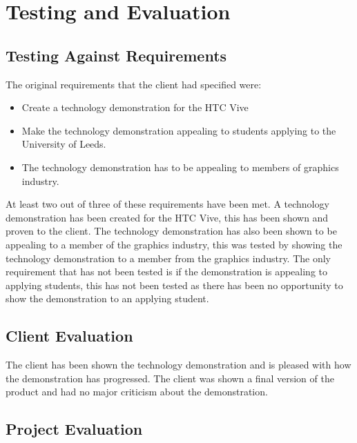 \chapter{Testing and Evaluation}
\label{chapter7}

\section{Testing Against Requirements}
	The original requirements that the client had specified were:

\begin{itemize}
	\item Create a technology demonstration for the HTC Vive
	\item Make the technology demonstration appealing to students applying to the University of Leeds.
	\item The technology demonstration has to be appealing to members of graphics industry.
\end{itemize}

	At least two out of three of these requirements have been met. A technology demonstration has been created for the HTC Vive, this has been shown and proven to the client. The technology demonstration has also been shown to be appealing to a member of the graphics industry, this was tested by showing the technology demonstration to a member from the graphics industry. The only requirement that has not been tested is if the demonstration is appealing to applying students, this has not been tested as there has been no opportunity to show the demonstration to an applying student.

\section{Client Evaluation}
	The client has been shown the technology demonstration and is pleased with how the demonstration has progressed. The client was shown a final version of the product and had no major criticism about the demonstration.

\section{Project Evaluation}
